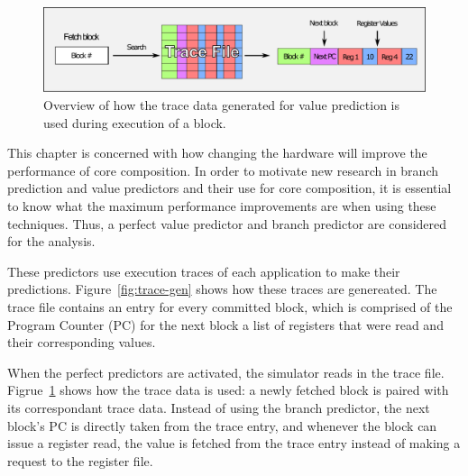 \begin{figure}[t]
    \centering
    \includegraphics[width=1\textwidth]{chapter3/graphics/fetching-trace.pdf}

    \caption{Overview of how the trace data generated for value prediction is used during execution of a block.}
    \label{fig:trace-used}
	\vspace{1em}
\end{figure}

This chapter is concerned with how changing the hardware will improve the performance of core composition.
In order to motivate new research in branch prediction and value predictors and their use for core composition, it is essential to know what the maximum performance improvements are when using these techniques. %
Thus, a perfect value predictor and branch predictor are considered for the analysis.

These predictors use execution traces of each application to make their predictions.
Figure~\ref{fig:trace-gen} shows how these traces are genereated.
The trace file contains an entry for every committed block, which is comprised of the Program Counter (PC) for the next block a list of registers that were read and their corresponding values.

When the perfect predictors are activated, the simulator reads in the trace file.
Figrue~\ref{fig:trace-used} shows how the trace data is used: a newly fetched block is paired with its correspondant trace data.
Instead of using the branch predictor, the next block's PC is directly taken from the trace entry, and whenever the block can issue a register read, the value is fetched from the trace entry instead of making a request to the register file.
\vspace{-2em}